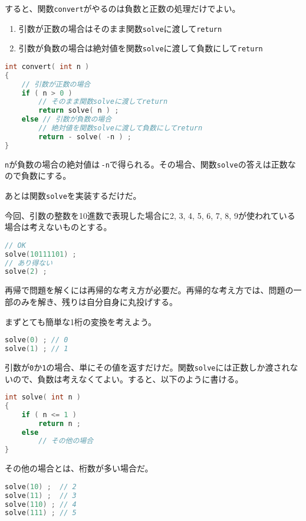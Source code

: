 すると、関数\texttt{convert}がやるのは負数と正数の処理だけでよい。

\begin{enumerate}
\def\labelenumi{\arabic{enumi}.}
\item
  引数が正数の場合はそのまま関数\texttt{solve}に渡して\texttt{return}
\item
  引数が負数の場合は絶対値を関数\texttt{solve}に渡して負数にして\texttt{return}
\end{enumerate}

\begin{lstlisting}[language={C++}]
int convert( int n )
{
    // 引数が正数の場合
    if ( n > 0 )
        // そのまま関数solveに渡してreturn
        return solve( n ) ;
    else // 引数が負数の場合
        // 絶対値を関数solveに渡して負数にしてreturn
        return - solve( -n ) ;
}
\end{lstlisting}

\texttt{n}が負数の場合の絶対値は\,\texttt{-n}で得られる。その場合、関数\texttt{solve}の答えは正数なので負数にする。

あとは関数\texttt{solve}を実装するだけだ。

今回、引数の整数を10進数で表現した場合に2, 3, 4, 5, 6, 7, 8, 9が使われている場合は考えないものとする。

\begin{lstlisting}[language={C++}]
// OK
solve(10111101) ;
// あり得ない
solve(2) ;
\end{lstlisting}

再帰で問題を解くには再帰的な考え方が必要だ。再帰的な考え方では、問題の一部のみを解き、残りは自分自身に丸投げする。

まずとても簡単な1桁の変換を考えよう。

\begin{lstlisting}[language={C++}]
solve(0) ; // 0
solve(1) ; // 1
\end{lstlisting}

引数が\texttt{0}か\texttt{1}の場合、単にその値を返すだけだ。関数\texttt{solve}には正数しか渡されないので、負数は考えなくてよい。すると、以下のように書ける。

\ifTombow\pagebreak\fi
\begin{lstlisting}[language={C++}]
int solve( int n )
{
    if ( n <= 1 )
        return n ;
    else
        // その他の場合
}
\end{lstlisting}

その他の場合とは、桁数が多い場合だ。

\begin{lstlisting}[language={C++}]
solve(10) ;  // 2
solve(11) ;  // 3
solve(110) ; // 4
solve(111) ; // 5
\end{lstlisting}

